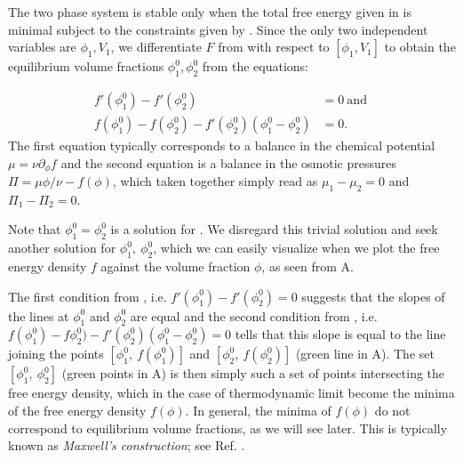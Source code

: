 The two phase system is stable only when the total free energy given in  is minimal subject to the constraints given by .
Since the only two independent variables are $\phi_1, V_1$, we differentiate $F$ from  with respect to $[\phi_1, V_1]$ to obtain the equilibrium volume fractions $\phi^0_1, \phi^0_2$ from the equations:

\begin{subequations}
\label{eqn:constraint_1}
\begin{align}
    f'(\phi^0_1) - f'(\phi^0_2) &= 0 \mathrm{~and~}
    \\[10pt]
    f(\phi^0_1) - f(\phi^0_2) - f'(\phi^0_2)(\phi^0_1 -\phi^0_2) &= 0.
\end{align}
\end{subequations}
The first equation typically corresponds to a balance in the chemical potential $\mu = \nu \partial_\phi f$ and the second equation is a balance in the osmotic pressures $\Pi = \mu \phi/\nu - f(\phi)$, which taken together simply read as $ \mu_1 - \mu_2 = 0$ and $\Pi_1 - \Pi_2 = 0$.

Note that $\phi^0_1 = \phi^0_2$ is a solution for . 
We disregard this trivial solution and seek another solution for $\phi^0_1,~\phi^0_2$, which we can easily visualize when we plot the free energy density $f$ against the volume fraction $\phi$, as seen from A.

The first condition from , i.e. $f'(\phi^0_1) - f'(\phi^0_2) = 0$ suggests that the slopes of the lines at $\phi^0_1$ and $\phi^0_2$ are equal and the second condition from , i.e. $f(\phi^0_1) - f\phi^0_2) - f'(\phi^0_2)(\phi^0_1 -\phi^0_2) = 0$ tells that this slope is equal to the line joining the points $[\phi^0_1,~ f(\phi^0_1)]$ and $[\phi^0_2,~f(\phi^0_2)]$ (green line in A).
The set $[\phi^0_1,~\phi^0_2]$ (green points in A) is then simply such a set of points intersecting the free energy density, which in the case of thermodynamic limit become the minima of the free energy density $f(\phi)$.
In general, the minima of $f(\phi)$ do not correspond to equilibrium volume fractions, as we will see later. 
This is typically known as \textit{Maxwell's construction}; see Ref. \cite{Review2019}.

